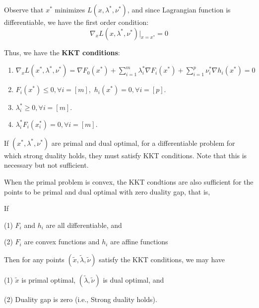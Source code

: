 Observe that $x^*$ minimizes $L(x,\lambda^*,\nu^*)$, and since Lagrangian function is differentiable, we have the first order condition:
\begin{equation*}
\nabla_x L(x,\lambda^*,\nu^*) {\vert}_{x=x^*} = 0
\end{equation*}

Thus, we have the \textbf{KKT conditions}:
\begin{enumerate}
	\item $\nabla_x L(x^*,\lambda^*,\nu^*) = \nabla F_0(x^*)+\sum^m_{i=1}\lambda^*_i \nabla F_i(x^*)+\sum^p_{i=1}\nu_i^*\nabla h_i(x^*)=0$
	
	\item $F_i(x^*) \leq 0,\forall i=[m]$,\  $h_i(x^*)=0,\forall i=[p]$.
	
	\item $\lambda_i^*\geq 0,\forall i=[m]$.
	
	\item $\lambda_i^*F_i(x_i^*)= 0,\forall i=[m]$.
\end{enumerate}

\begin{theorem}\label{kktnecessary}
	If $(x^*,\lambda^*,\nu^*)$ are primal and dual optimal, for a differentiable problem for which strong duality holds, they must satisfy KKT conditions. Note that this is necessary but not sufficient.
\end{theorem}


\begin{theorem}\label{kktsufficient}
	When the primal problem is convex, the KKT condtions are also sufficient for the points to be primal and dual optimal with zero duality gap, that is, 
	
	If
	
		(1) $F_i$ and $h_i$ are all differentiable, and
		
		(2) $F_i$ are convex functions and $h_i$ are affine functions
	
	Then for any points $(\tilde{x},\tilde{\lambda},\tilde{\nu})$ satisfy the KKT conditions, we may have
		
	 	(1)	$\tilde{x}$ is primal optimal, $(\tilde{\lambda},\tilde{\nu})$ is  dual optimal, and
	 	
	 	(2) Duality gap is zero (i.e., Strong duality holds).
	 	

\end{theorem}

